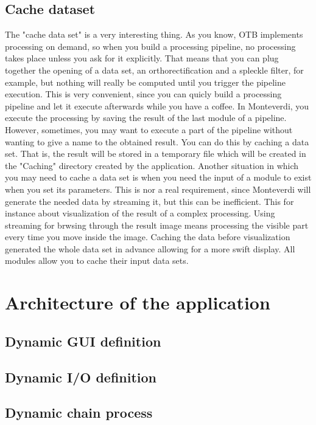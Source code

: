 \documentclass{InsightSoftwareGuide}
\begin{document}
\section{Cache dataset}
The "cache data set" is a very interesting thing. As you know, OTB implements processing on demand, so when you build a 
processing pipeline, no processing takes place unless you ask for it explicitly. That means that you can plug together
 the opening of a data set, an orthorectification and a spleckle filter, for example, but nothing will really be computed 
until you trigger the pipeline execution. This is very convenient, since you can quicly build a processing pipeline and 
let it execute afterwards while you have a coffee. In Monteverdi, you execute the processing by saving the result of the 
last module of a pipeline. However, sometimes, you may want to execute a part of the pipeline without wanting to give a 
name to the obtained result. You can do this by caching a data set. That is, the result will be stored in a temporary 
file which will be created in the "Caching" directory created by the application. Another situation in which you may need 
to cache a data set is when you need the input of a module to exist when you set its parameters. This is nor a real requirement, 
since Monteverdi will generate the needed data by streaming it, but this can be inefficient. This for instance about visualization
 of the result of a complex processing. Using streaming for brwsing through the result image means processing the visible part 
every time you move inside the image. Caching the data before visualization generated the whole data set in advance allowing 
for a more swift display. All modules allow you to cache their input data sets.

\chapter{Architecture of the application}
\section{Dynamic GUI definition}
\section{Dynamic I/O definition}
\section{Dynamic chain process}
\end{document}
